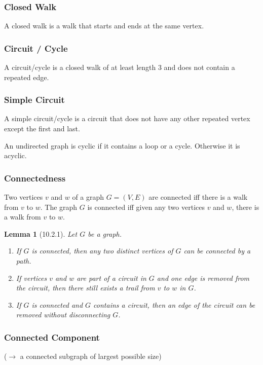 \documentclass{article}
\theoremstyle{plain}
\newtheorem{lemma}[theorem]{Lemma}
\theoremstyle{definition}
\theoremstyle{remark}
\begin{document}
\subsubsection*{Closed Walk}
A closed walk is a walk that starts and ends at the same vertex.
 
\subsubsection*{Circuit / Cycle}
A circuit/cycle is a closed walk of at least length 3 and does not contain a repeated edge.
 
\subsubsection*{Simple Circuit}
A simple circuit/cycle is a circuit that does not have any other repeated vertex except the first and last.
 
An undirected graph is cyclic if it contains a loop or a cycle. Otherwise it is acyclic.
 
\subsubsection*{Connectedness}
Two vertices $v$ and $w$ of a graph $G=(V,E)$ are connected iff there is a walk from $v$ to $w$. The graph $G$ is connected iff given any two vertices $v$ and $w$, there is a walk from $v$ to $w$.
 
\begin{lemma}[10.2.1]
    Let $G$ be a graph.
    \begin{enumerate}
        \item[a.] If $G$ is connected, then any two distinct vertices of $G$ can be connected by a path.
        \item[b.] If vertices $v$ and $w$ are part of a circuit in $G$ and one edge is removed from the circuit, then there still exists a trail from $v$ to $w$ in $G$.
        \item[c.] If $G$ is connected and $G$ contains a circuit, then an edge of the circuit can be removed without disconnecting $G$.
    \end{enumerate}
\end{lemma}
 
\subsubsection*{Connected Component}
($\to$ a connected subgraph of largest possible size)
 
\end{document}
